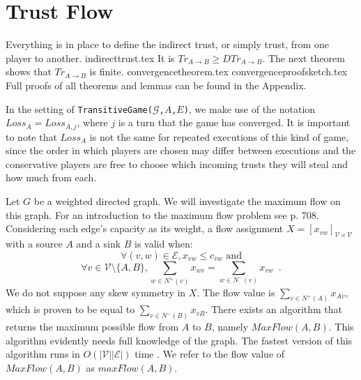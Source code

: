 \section{Trust Flow}
  Everything is in place to define the indirect trust, or simply trust, from one player to another.
  {indirecttrust.tex}
  \noindent It is $Tr_{A \rightarrow B} \geq DTr_{A \rightarrow B}$. The next theorem shows that
  $Tr_{A \rightarrow B}$ is finite.
  {convergencetheorem.tex}
  {convergenceproofsketch.tex}
  Full proofs of all theorems and lemmas can be found in the Appendix.

  In the setting of \texttt{TransitiveGame(}$\mathcal{G}$\texttt{,}$A$\texttt{,}$E$\texttt{)}, we make use of the notation
  $Loss_A = Loss_{A, j}$, where $j$ is a turn that the game has converged. It is important to note that $Loss_A$ is
  not the same for repeated executions of this kind of game, since the order in which players are chosen may differ between
  executions and the conservative players are free to choose which incoming trusts they will steal and how much from each.

  Let $G$ be a weighted directed graph. We will investigate the maximum flow on this graph. For an introduction to the
  maximum flow problem see \cite{clrs} p. 708. Considering each edge's capacity as its weight, a flow assignment
  $X = [x_{vw}]_{\mathcal{V} \times \mathcal{V}}$ with a source $A$ and a sink $B$ is valid when:
  \begin{equation}
  \label{flow1}
     \forall (v, w) \in \mathcal{E}, x_{vw} \leq c_{vw} \mbox{ and}
  \end{equation}
  \begin{equation}
  \label{flow2}
     \forall v \in \mathcal{V} \setminus \{A,B\}, \sum\limits_{w \in N^{+}(v)}x_{wv} = \sum\limits_{w \in N^{-}(v)}x_{vw}
     \enspace.
  \end{equation}
  We do not suppose any skew symmetry in $X$. The flow value is $\sum\limits_{v \in N^{+}\left(A\right)}x_{Av}$, which is
  proven to be equal to $\sum\limits_{v \in N^{-}\left(B\right)}x_{vB}$. There exists an algorithm that returns the maximum
  possible flow from $A$ to $B$, namely $MaxFlow\left(A, B\right)$. This algorithm evidently needs full knowledge of the
  graph. The fastest version of this algorithm runs in $O\left(|\mathcal{V}||\mathcal{E}|\right)$ time \cite{maxflownm}. We
  refer to the flow value of $MaxFlow\left(A, B\right)$ as $maxFlow\left(A, B\right)$.

